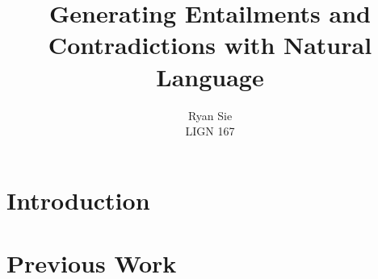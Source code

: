 \documentclass[a4paper, 12pt]{article}
\title{Generating Entailments and Contradictions with Natural Language}
\date{}
\author{Ryan Sie \\ LIGN 167}
\begin{document}
\maketitle

\section{Introduction}

\section{Previous Work}
\end{document}
